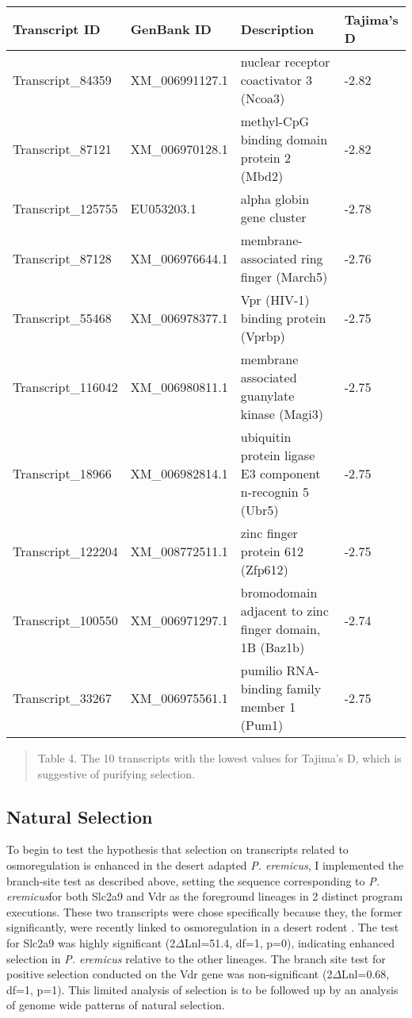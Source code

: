 \documentclass[11pt]{article}
\newcommand{\peer}{\textit{P. eremicus}}
\begin{document}
\begin{center}
\begin{adjustwidth}{-.75in}{-.75in}%
\begin{tabular}{ l l l l }
\textbf{Transcript ID} & \textbf{GenBank ID} & \textbf{Description} & \textbf{Tajima's D} \\
\hline
Transcript\_84359 & XM\_006991127.1 & nuclear receptor coactivator 3 (Ncoa3) & -2.82\\
Transcript\_87121 & XM\_006970128.1 & methyl-CpG binding domain protein 2 (Mbd2) & -2.82 \\
Transcript\_125755 & EU053203.1 & alpha globin gene cluster & -2.78\\
Transcript\_87128 & XM\_006976644.1 & membrane-associated ring finger (March5) & -2.76 \\
Transcript\_55468 & XM\_006978377.1 & Vpr (HIV-1) binding protein (Vprbp) & -2.75\\
Transcript\_116042 & XM\_006980811.1 & membrane associated guanylate kinase (Magi3) & -2.75  \\
Transcript\_18966 & XM\_006982814.1 & ubiquitin protein ligase E3 component n-recognin 5 (Ubr5) & -2.75 \\
Transcript\_122204 & XM\_008772511.1 & zinc finger protein 612 (Zfp612) & -2.75 \\
Transcript\_100550 & XM\_006971297.1 & bromodomain adjacent to zinc finger domain, 1B (Baz1b) & -2.74\\
Transcript\_33267 & XM\_006975561.1 & pumilio RNA-binding family member 1 (Pum1) & -2.75\\
 \end{tabular}
\begin{quote}
\small{Table 4. The 10 transcripts with the lowest values for Tajima's D, which is suggestive of purifying selection.}
\end{quote}  
\end{adjustwidth}
\end{center}

\subsection*{Natural Selection}

To begin to test the hypothesis that selection on transcripts related to osmoregulation is enhanced in the desert adapted \peer, I implemented the branch-site test as described above, setting the sequence corresponding to \peer\:for both Slc2a9 and Vdr as the foreground lineages in 2 distinct program executions. These two transcripts were chose specifically because they, the former significantly, were recently linked to osmoregulation in a desert rodent \cite{Marra:2014de}. The test for Slc2a9 was highly significant (2$\Delta$Lnl=51.4, df=1, p=0), indicating enhanced selection in \peer\: relative to the other lineages. The branch site test for positive selection conducted on the Vdr gene was non-significant (2$\Delta$Lnl=0.68, df=1, p=1). This limited analysis of selection is to be followed up by an analysis of genome wide patterns of natural selection. \\
\end{document}
